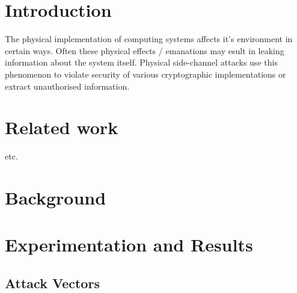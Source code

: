 \documentclass[11pt]{report} %
\begin{document}
    \newenvironment{mainf}{}{}
    \titlespacing*{\chapter}{0pt}{-29 pt}{6 pt} %
    \begin{mainf}
    
    \newpage
    \pagestyle{plain} %
    
    \setlength{\parskip}{10 pt} %
    \setlength{\parindent}{0pt}
    
    \chapter{\textbf{Introduction}}
    \begin{center}
        \begin{minipage}{\textwidth}
            The physical implementation of computing systems affects it's environment in certain ways. Often these physical effects / emanations may esult in leaking information about the system itself. Physical side-channel attacks use this phenomenon to violate security of various cryptographic implementations or extract unauthorised information. 
        \end{minipage}      
    \end{center}


    \chapter{Related work}  etc.
    \chapter{Background}
    \chapter{Experimentation and Results}
        \section{Attack Vectors}

\end{mainf}
\end{document}
